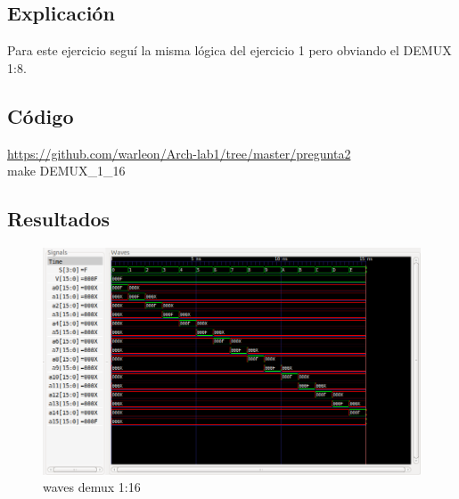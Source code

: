 \subsection*{Explicación}
Para este ejercicio seguí la misma lógica del ejercicio 1 pero obviando el DEMUX 1:8.

\subsection*{Código}
\faGithub \space
\href{https://github.com/warleon/Arch-lab1/tree/master/pregunta2}{https://github.com/warleon/Arch-lab1/tree/master/pregunta2}\\
make DEMUX\_1\_16



\subsection*{Resultados}
\begin{figure}[h]
    \centering
    \includegraphics[scale=0.5]{fotos/resultados/arki-DEMUX_1_16.png}
    \caption{waves demux 1:16}
\end{figure}